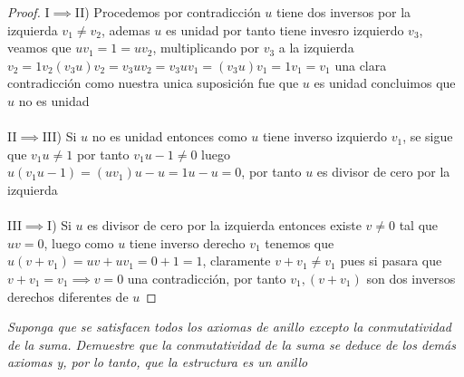 \documentclass[11pt,letterpaper]{article}
\begin{document}
    
\begin{proof}
    I$\implies$II) Procedemos por contradicci\'on $u$ tiene dos inversos por la izquierda $v_1\neq v_2$, ademas $u$ es unidad por tanto tiene invesro izquierdo $v_3$, veamos que
    $uv_1=1=uv_2$, multiplicando por $v_3$ a la izquierda $v_2=1v_2(v_3u)v_2=v_3uv_2=v_3uv_1=(v_3u)v_1=1v_1=v_1$
    una clara contradicci\'on como nuestra unica suposici\'on fue que $u$ es unidad concluimos que $u$ no es unidad
    \,\\
    \,\\
    II$\implies$III) Si $u$ no es unidad entonces como $u$ tiene inverso izquierdo $v_1$, se sigue que $v_1u\neq 1$ por tanto $v_1u-1\neq 0$ luego
    $u(v_1u-1)=(uv_1)u-u=1u-u=0$, por tanto $u$ es divisor de cero por la izquierda \,\\
    \,\\
    III$\implies $I) Si $u$ es divisor de cero por la izquierda entonces existe $v\neq 0 $ tal que $uv=0$, luego como $u$ tiene inverso derecho $v_1$ tenemos que $u(v+v_1)=uv+uv_1=0+1=1$, claramente $v+v_1\neq v_1$ pues si pasara que
    $v+v_1=v_1\implies v=0 $ una contradicci\'on, por tanto $v_1,(v+v_1)$ son dos inversos derechos diferentes de $u$
\end{proof}
\begin{tcolorbox}[
	title = \textcolor{black}{\textcolor{white}{Problema 7}},]
\textit{Suponga que se satisfacen todos los axiomas de anillo excepto la conmutatividad de la suma.
Demuestre que la conmutatividad de la suma se deduce de los dem\'as axiomas y, por lo tanto, que la estructura es un anillo}
\end{tcolorbox}
\end{document}
